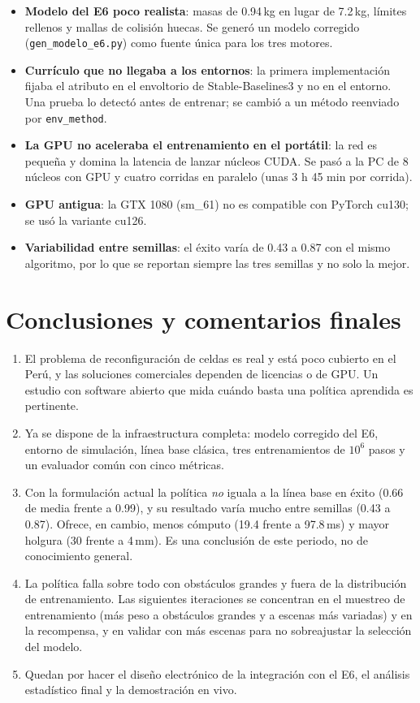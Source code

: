 \documentclass[11pt,a4paper,twoside]{article}
\begin{document}
\begin{itemize}
\item \textbf{Modelo del E6 poco realista}: masas de 0.94\,kg en lugar de 7.2\,kg, límites rellenos y mallas de colisión huecas. Se generó un modelo corregido (\texttt{gen\_modelo\_e6.py}) como fuente única para los tres motores.
\item \textbf{Currículo que no llegaba a los entornos}: la primera implementación fijaba el atributo en el envoltorio de Stable-Baselines3 y no en el entorno. Una prueba lo detectó antes de entrenar; se cambió a un método reenviado por \texttt{env\_method}.
\item \textbf{La GPU no aceleraba el entrenamiento en el portátil}: la red es pequeña y domina la latencia de lanzar núcleos CUDA. Se pasó a la PC de 8 núcleos con GPU y cuatro corridas en paralelo (unas 3 h 45 min por corrida).
\item \textbf{GPU antigua}: la GTX 1080 (sm\_61) no es compatible con PyTorch cu130; se usó la variante cu126.
\item \textbf{Variabilidad entre semillas}: el éxito varía de 0.43 a 0.87 con el mismo algoritmo, por lo que se reportan siempre las tres semillas y no solo la mejor.
\end{itemize}

\section{Conclusiones y comentarios finales}

\begin{enumerate}
\item El problema de reconfiguración de celdas es real y está poco cubierto en el Perú, y las soluciones comerciales dependen de licencias o de GPU. Un estudio con software abierto que mida cuándo basta una política aprendida es pertinente.
\item Ya se dispone de la infraestructura completa: modelo corregido del E6, entorno de simulación, línea base clásica, tres entrenamientos de $10^6$ pasos y un evaluador común con cinco métricas.
\item Con la formulación actual la política \emph{no} iguala a la línea base en éxito (0.66 de media frente a 0.99), y su resultado varía mucho entre semillas (0.43 a 0.87). Ofrece, en cambio, menos cómputo (19.4 frente a 97.8\,ms) y mayor holgura (30 frente a 4\,mm). Es una conclusión de este periodo, no de conocimiento general.
\item La política falla sobre todo con obstáculos grandes y fuera de la distribución de entrenamiento. Las siguientes iteraciones se concentran en el muestreo de entrenamiento (más peso a obstáculos grandes y a escenas más variadas) y en la recompensa, y en validar con más escenas para no sobreajustar la selección del modelo.
\item Quedan por hacer el diseño electrónico de la integración con el E6, el análisis estadístico final y la demostración en vivo.
\end{enumerate}
\end{document}
